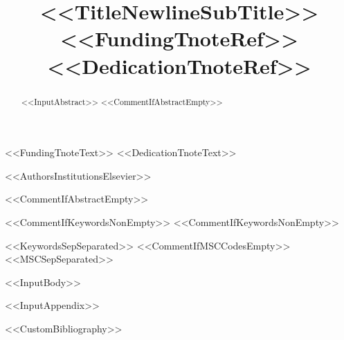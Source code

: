 \documentclass[%
preprint,
12pt,
<<DocumentClassOptions>>]{elsarticle}
\begin{document}
\begin{frontmatter}

\title{<<TitleNewlineSubTitle>><<FundingTnoteRef>><<DedicationTnoteRef>>}
<<FundingTnoteText>>
<<DedicationTnoteText>>

<<AuthorsInstitutionsElsevier>>

<<CommentIfAbstractEmpty>>\begin{abstract}
<<InputAbstract>>
<<CommentIfAbstractEmpty>>\end{abstract}

\makeatletter
<<CommentIfKeywordsNonEmpty>>\gdef\@elsarticlekwdtitle{}
<<CommentIfKeywordsNonEmpty>>\gdef\@elsarticlekeywordtitlesep{}
\makeatother
\begin{keyword}
<<KeywordsSepSeparated>>
<<CommentIfMSCCodesEmpty>>\MSC[2020] <<MSCSepSeparated>>
\end{keyword}

\end{frontmatter}

<<InputBody>>

\appendix
<<InputAppendix>>


<<CustomBibliography>>
\end{document}
